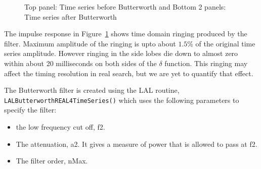 \begin{figure}[h]
\begin{center}
\caption{Top panel: Time series before Butterworth and 
Bottom 2 panels: Time series after Butterworth} \label{fig:checkbuttertimeseries}
\end{center}
\end{figure}
The impulse response in Figure~\ref{fig:checkbuttertimeseries} shows  
time domain ringing produced by the filter. Maximum amplitude of 
the ringing is upto about $1.5$\% of the original time series amplitude.
However ringing in the side lobes die down to almost zero within about
20 milliseconds on both sides of the $\delta$ function. This ringing may
affect the timing resolution in real search, but we are yet
to quantify that effect.  

The Butterworth filter is created using the LAL routine,
\texttt{LALButterworthREAL4TimeSeries()} which uses the following 
parameters to specify the filter:
\begin{itemize}
  \item the low frequency cut off, f2. 
  \item The attenuation, a2. It gives a measure of power
    that is allowed to pass at f2.
  \item The filter order, nMax.
\end{itemize}

